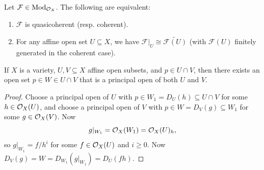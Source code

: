 \begin{prop}\label{prop:qc-coh-equiv}
  Let $\mathcal{F} \in \mathrm{Mod}_{\mathcal{O}_X}$.
  The following are equivalent:
  \begin{enumerate}
    \item $\mathcal{F}$ is
      quasicoherent (resp. coherent).
    \item For any affine open set
      $U \subseteq X$, we have
      $\mathcal{F}|_U \cong \widetilde{\mathcal{F}(U)}$
      (with $\mathcal{F}(U)$ finitely
      generated in the coherent case).
  \end{enumerate}
\end{prop}

\begin{lemma}\label{lem:affine-communication}
  If $X$ is a variety,
  $U, V \subseteq X$ affine open
  subsets, and $p \in U \cap V$,
  then there exists an open set
  $p \in W \in U \cap V$ that is a
  principal open of both $U$ and $V$.
\end{lemma}

\begin{proof}
  Choose a principal open of $U$
  with $p \in W_1 = D_U(h) \subseteq U \cap V$
  for some $h \in \mathcal{O}_X(U)$,
  and choose a principal open
  of $V$ with $p \in W = D_V(g) \subseteq W_1$
  for some $g \in \mathcal{O}_X(V)$. Now
  \[
    g|_{W_1}
    = \mathcal{O}_X(W_1)
    = \mathcal{O}_X(U)_h,
  \]
  so $g|_{W_1} = f / h^i$ for some
  $f \in \mathcal{O}_X(U)$ and $i \ge 0$. Now
  $D_V(g) = W = D_{W_1}(g|_{W_1}) = D_U(f h)$.
\end{proof}


